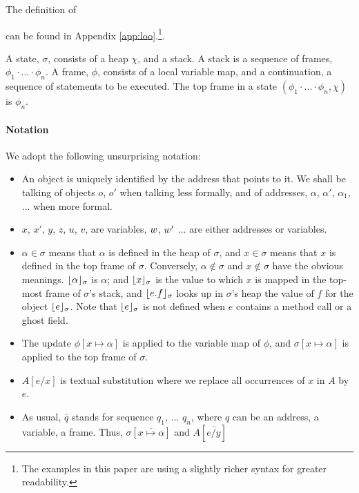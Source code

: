  The definition of \LangOO~ {can be found in   {Appendix \ref{app:loo}.}\footnote{{{The examples in this paper are using  a slightly richer syntax for greater readability.}}}.
 
A \LangOO state, $\sigma$,  consists of a  heap $\chi$, and a   stack. 
{A stack  is a sequence of frames, $\phi_1\!\cdot\!...\!\cdot\! \phi_n$.}
A  frame, $\phi$, consists of a local variable map, and a continuation, \ie a sequence of statements to be executed.
The top frame in a state $(\phi_1\!\cdot\!...\!\cdot\! \phi_n, \chi)$ is $\phi_n$. 


 
\paragraph{Notation} We adopt the following unsurprising notation:
\label{s:notation}
\begin{itemize}
\item
{An object is uniquely identified by the address that points to it. We shall be talking of objects $o$, $o'$ when talking less formally, and of addresses, $\alpha$, $\alpha'$, $\alpha_1$, ...  when more formal.}
\item
$x$, $x'$, $y$, $z$, $u$, $v$,  are variables,  $w$, $w'$ ... are either addresses or variables. %
\item
$\alpha \in \sigma$ means that $\alpha$ is defined in the heap of $\sigma$, and $x\in \sigma$ means that $x$ is defined in the top frame of $\sigma$.
Conversely,  $\alpha\notin\sigma$ and $x\notin\sigma$ %
 have the obvious meanings.
$\lfloor \alpha \rfloor_{\sigma}$  is $\alpha$; and $\lfloor x \rfloor_{\sigma}$  is the value to which  $x$  is mapped in the top-most frame of $\sigma$'s stack, 
and $\lfloor e.f \rfloor_{\sigma}$ looks up in $\sigma$'s heap the value of $f$ for the object  $\lfloor e \rfloor_{\sigma}$.
Note that $\lfloor e \rfloor_{\sigma}$ is not defined when $e$ contains a method call or a ghost field.
\item The  update
$\phi[x \mapsto \alpha]$ is applied to the variable map  of $\phi$,  
and  $\sigma[x \mapsto \alpha]$ is applied to the top frame of $\sigma$.
\item
$A[e/x]$ is textual substitution where we replace all occurrences of $x$ in $A$ by $e.$ 
\item
As usual, $\overline q$ stands for  sequence $q_1$, ... $q_n$, where $q$ can be an address, a variable,    a frame.
Thus,   $\sigma[\overline{x \mapsto \alpha}]$ and $A[ \overline{e/y}]$ 

\end{itemize}}
